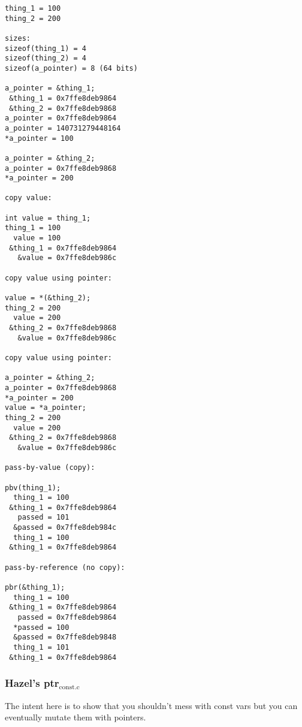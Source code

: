 \documentclass[11pt]{article}
\begin{document}
\begin{verbatim}
thing_1 = 100
thing_2 = 200

sizes:
sizeof(thing_1) = 4
sizeof(thing_2) = 4
sizeof(a_pointer) = 8 (64 bits)

a_pointer = &thing_1;
 &thing_1 = 0x7ffe8deb9864
 &thing_2 = 0x7ffe8deb9868
a_pointer = 0x7ffe8deb9864
a_pointer = 140731279448164
*a_pointer = 100

a_pointer = &thing_2;
a_pointer = 0x7ffe8deb9868
*a_pointer = 200

copy value:

int value = thing_1;
thing_1 = 100
  value = 100
 &thing_1 = 0x7ffe8deb9864
   &value = 0x7ffe8deb986c

copy value using pointer:

value = *(&thing_2);
thing_2 = 200
  value = 200
 &thing_2 = 0x7ffe8deb9868
   &value = 0x7ffe8deb986c

copy value using pointer:

a_pointer = &thing_2;
a_pointer = 0x7ffe8deb9868
*a_pointer = 200
value = *a_pointer;
thing_2 = 200
  value = 200
 &thing_2 = 0x7ffe8deb9868
   &value = 0x7ffe8deb986c

pass-by-value (copy):

pbv(thing_1);
  thing_1 = 100
 &thing_1 = 0x7ffe8deb9864
   passed = 101
  &passed = 0x7ffe8deb984c
  thing_1 = 100
 &thing_1 = 0x7ffe8deb9864

pass-by-reference (no copy):

pbr(&thing_1);
  thing_1 = 100
 &thing_1 = 0x7ffe8deb9864
   passed = 0x7ffe8deb9864
  *passed = 100
  &passed = 0x7ffe8deb9848
  thing_1 = 101
 &thing_1 = 0x7ffe8deb9864
\end{verbatim}

\subsubsection{Hazel's ptr\(_{\text{const.c}}\)}
\label{sec:org1e71eb3}

The intent here is to show that you shouldn't mess with const vars but
you can eventually mutate them with pointers.
\end{document}
